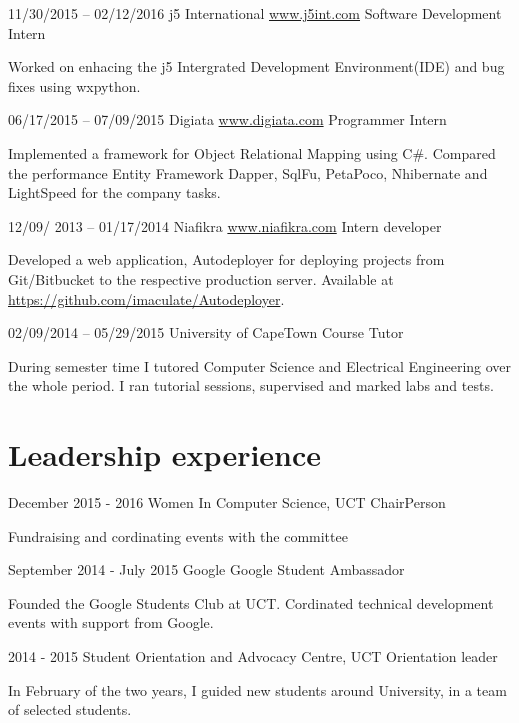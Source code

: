 \documentclass[fontsize=9pt]{tccv}
\begin{document}
\begin{eventlist}
\item{11/30/2015 -- 02/12/2016}
     {j5 International \url{www.j5int.com}}
     {Software Development Intern}

Worked on enhacing the j5 Intergrated Development Environment(IDE) and bug fixes using wxpython.

\item{06/17/2015 -- 07/09/2015}
     {Digiata \url{www.digiata.com}}
     {Programmer Intern}

Implemented a framework for Object Relational Mapping using C\#.
Compared the performance Entity Framework Dapper, SqlFu, PetaPoco, Nhibernate and LightSpeed for the company tasks.

\item{12/09/ 2013 -- 01/17/2014}
     {Niafikra \url{www.niafikra.com}}
     {Intern developer}

Developed a web application, Autodeployer for deploying projects from Git/Bitbucket to the respective
production server. Available at \url{https://github.com/imaculate/Autodeployer}.

\item{02/09/2014 -- 05/29/2015}
     {University of CapeTown}
     {Course Tutor}

During semester time I tutored Computer Science and Electrical Engineering over the whole period. I ran tutorial sessions, supervised and marked labs and tests.

\end{eventlist}

\section{Leadership experience}

\begin{eventlist}
\item{December 2015 - 2016}
	{Women In Computer Science, UCT}
	{ChairPerson}
	
Fundraising and cordinating events with the committee

\item{September 2014 - July 2015}
{Google}
{Google Student Ambassador}

Founded the Google Students Club at UCT. Cordinated technical development events with support from Google.

\item{2014 - 2015}
{Student Orientation and Advocacy Centre, UCT}
{Orientation leader}

In February of the two years, I guided new students around University, in a team of selected students.

\end{eventlist}
\end{document}
